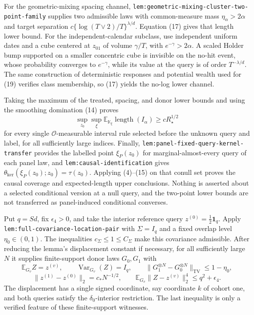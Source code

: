 For the geometric-mixing spacing channel,
\texttt{lem:geometric-mixing-cluster-two-point-family} supplies two admissible laws with common-measure mass \(\eta_\alpha>2\alpha\) and target separation
\(c\{\log(T\vee2)/T\}^{\lambda/d}\).  Equation (17) gives that length lower bound.  For the independent-calendar subclass, use independent uniform dates and a cube centered at \(z_{01}\) of volume \(\gamma/T\), with \(e^{-\gamma}>2\alpha\).  A scaled Holder bump supported on a smaller concentric cube is invisible on the no-hit event, whose probability converges to \(e^{-\gamma}\), while its value at the query is of order \(T^{-\lambda/d}\).  The same construction of deterministic responses and potential wealth used for (19) verifies class membership, so (17) yields the no-log lower channel.

Taking the maximum of the treated, spacing, and donor lower bounds and using the smoothing domination (14) proves
\[
 \sup_{z_0}\sup_{\xi}
 \mathbb E_{\mathbb K_\xi}\operatorname{length}(I_\alpha)
 \ge cR_\star^{1/2}                                        \tag{21}
\]
for every single \(\mathcal O\)-measurable interval rule selected before the unknown query and label, for all sufficiently large indices.  Finally, \texttt{lem:panel-fixed-query-kernel-transfer} provides the labelled point \(\xi_P(z_0)\) for marginal-almost-every query of each panel law, and \texttt{lem:causal-identification} gives
\(\theta_{\mathrm{ker}}(\xi_P(z_0);z_0)=\tau(z_0)\).  Applying (4)--(15) on that conull set proves the causal coverage and expected-length upper conclusions.  Nothing is asserted about a selected conditional version at a null query, and the two-point lower bounds are not transferred as panel-induced conditional converses.

Put \(q=Sd\), fix \(\epsilon_4>0\), and take the interior reference query
\(z^{(0)}=\tfrac12\mathbf 1_q\).  Apply
\texttt{lem:full-covariance-location-pair} with \(\Sigma=I_q\) and a fixed overlap level \(\eta_0\in(0,1)\).  The inequalities
\(c_\Sigma\le1\le C_\Sigma\) make this covariance admissible.  After reducing the lemma's displacement constant if necessary, for all sufficiently large \(N\) it supplies finite-support donor laws \(G_0,G_1\) with
\[
 \mathbb E_{G_v}Z=z^{(v)},
 \qquad \operatorname{Var}_{G_v}(Z)=I_q,
 \qquad \|G_1^{\otimes N}-G_0^{\otimes N}\|_{\mathrm{TV}}
 \le1-\eta_0,                                               \tag{1}
\]
\[
 \|z^{(1)}-z^{(0)}\|_2=c_*N^{-1/2},
 \qquad
 \mathbb E_{G_v}\|Z-z^{(v)}\|_2^4\le q^2+\epsilon_4.      \tag{2}
\]
The displacement has a single signed coordinate, say coordinate \(k\) of cohort one, and both queries satisfy the \(\delta_0\)-interior restriction.  The last inequality is only a verified feature of these finite-support witnesses.


